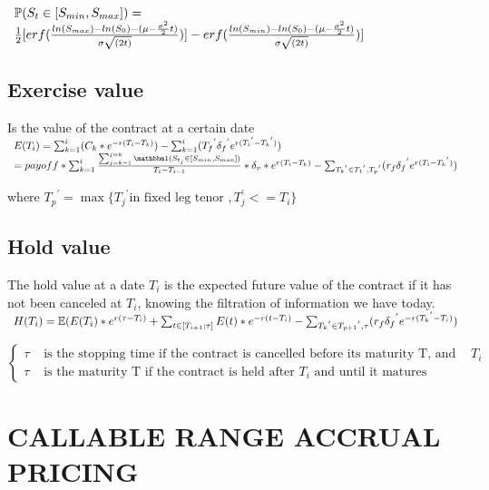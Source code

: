\documentclass[12pt]{article}
\begin{document}
 					$\begin{array}{lcl}
 					\mathbb{P}(S_t \in [S_{min},S_{max}]) =\\ \frac{1}{2}[erf(\frac{ln(S_{max})-ln(S_0)-(\mu-\frac{\sigma^2}{2}t)}{\sigma \sqrt{(2t)}})]-erf(\frac{ln(S_{min})-ln(S_0)-(\mu-\frac{\sigma^2}{2}t)}{\sigma \sqrt{(2t)}})]
 					\end{array}$
	 	\subsection{Exercise value}
	 	
		 	Is the value of the contract at a certain date\\
		 	$\begin{array}{lcl}
			 	E(T_i) = \sum_{k = 1}^{i} (C_k * e^{-r(T_i - T_k)}) -  \sum_{k = 1}^{i} ({T_f}^{'} {\delta_f}^{'} e^{r({T_i}^{'} - {T_k}^{'})})\\
			 	=payoff * \sum_{k=1}^{i}\frac{\sum_{j=k - 1}^{j=k}\indicator (S_{t_j} \in [S_{min},S_{max}])}{T_i - T_{i-1}} * \delta_v * e^{r(T_i - T_k)} -  \sum_{{T_k}^{'} \in {{T_1}^{'}, {T_p}^{'}}} (r_f{\delta_f}^{'} e^{r({T_i} - {T_k}^{'})})
		 	\end{array}$
		 	
		 	where ${T_p}^{'} = \max\{{T_j}^{'} \mbox{in fixed leg tenor }, T_j^{'} <= T_i\}$
	 	\subsection{Hold value}
	 	The hold value at a date $T_i$ is the expected future value of the contract if it has not been canceled at $T_i$, knowing the filtration of information we have today.\\
	 	$\begin{array}{lcl}
		 	H(T_i) = \E(E(T_{i}) * e^{r(\tau-T_i)} + \sum_{t \in[T_{i+1}; \tau ]}E(t)*e^{-r(t - T_i)} -  \sum_{{T_k}^{'} \in {{T_{p+1}}^{'}, \tau}} (r_f {\delta_f}^{'} e^{-r({T_k}^{'} - {T_i})})\\
		 	
	 	\end{array}$
	 	
	 	$$
		\left\{
		 	\begin{array}{ll}
		 	\tau & \mbox{ is the stopping time if the contract is cancelled before its maturity T, and after $T_i$} \\
		 	\tau & \mbox{ is the maturity T if the contract is held after $T_i$  and until it matures}
		 	\end{array}
	\right.
	 	$$
	\section{CALLABLE RANGE ACCRUAL PRICING}
\end{document}
